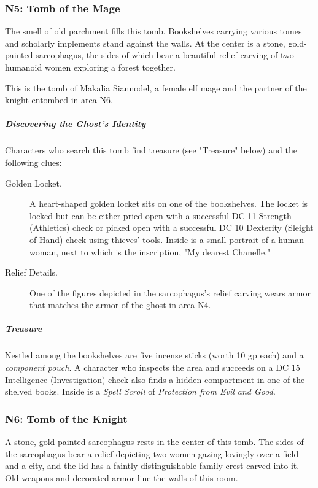\documentclass[10pt,a4paper,twoside,fancy,bg=print,twocolumn,openany,nodeprecatedcode]{dndbook}
\begin{document}
\subsubsection{N5: Tomb of the Mage}
\begin{DndReadAloud}{}
The smell of old parchment fills this tomb. Bookshelves carrying various tomes and scholarly implements stand against the walls. At the center is a stone, gold-painted sarcophagus, the sides of which bear a beautiful relief carving of two humanoid women exploring a forest together.

\end{DndReadAloud}

This is the tomb of Makalia Siannodel, a female elf mage and the partner of the knight entombed in area N6.

\subparagraph{Discovering the Ghost's Identity}
Characters who search this tomb find treasure (see "Treasure" below) and the following clues:


\begin{description}
\item[Golden Locket.]
A heart-shaped golden locket sits on one of the bookshelves. The locket is locked but can be either pried open with a successful DC 11 Strength (Athletics) check or picked open with a successful DC 10 Dexterity (Sleight of Hand) check using thieves' tools. Inside is a small portrait of a human woman, next to which is the inscription, "My dearest Chanelle."
\item[Relief Details.]
One of the figures depicted in the sarcophagus's relief carving wears armor that matches the armor of the ghost in area N4.
\end{description}

\subparagraph{Treasure}
Nestled among the bookshelves are five incense sticks (worth 10 gp each) and a \textit{component pouch}. A character who inspects the area and succeeds on a DC 15 Intelligence (Investigation) check also finds a hidden compartment in one of the shelved books. Inside is a \textit{Spell Scroll} of \textit{Protection from Evil and Good}.

\subsubsection{N6: Tomb of the Knight}
\begin{DndReadAloud}{}
A stone, gold-painted sarcophagus rests in the center of this tomb. The sides of the sarcophagus bear a relief depicting two women gazing lovingly over a field and a city, and the lid has a faintly distinguishable family crest carved into it. Old weapons and decorated armor line the walls of this room.

\end{DndReadAloud}
\end{document}
